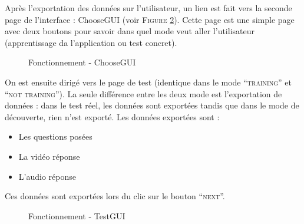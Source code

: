 Après l'exportation des données sur l'utilisateur, un lien est fait vers la seconde page de l'interface : ChooseGUI (voir \textsc{Figure} \ref{ChooseGUI}). Cette page est une simple page avec deux boutons pour savoir dans quel mode veut aller l'utilisateur (apprentissage da l'application ou test concret).

\newpage

\begin{figure}[!ht]
\begin{center}
  \caption{Fonctionnement - ChooseGUI}
  \label{ChooseGUI} 
\end{center}
\end{figure}

On est ensuite dirigé vers le page de test (identique dans le mode ``\textsc{training}'' et ``\textsc{not training}''). La seule différence entre les deux mode est l'exportation de données : dans le test réel, les données sont exportées tandis que dans le mode de découverte, rien n'est exporté.
Les données exportées sont :
\begin{itemize}
 \item Les questions posées
 \item La vidéo réponse
 \item L'audio réponse
\end{itemize}
Ces données sont exportées lors du clic sur le bouton ``\textsc{next}''.

\begin{figure}[!ht]
\begin{center}
  \caption{Fonctionnement - TestGUI}
  \label{ChooseGUI} 
\end{center}
\end{figure}

